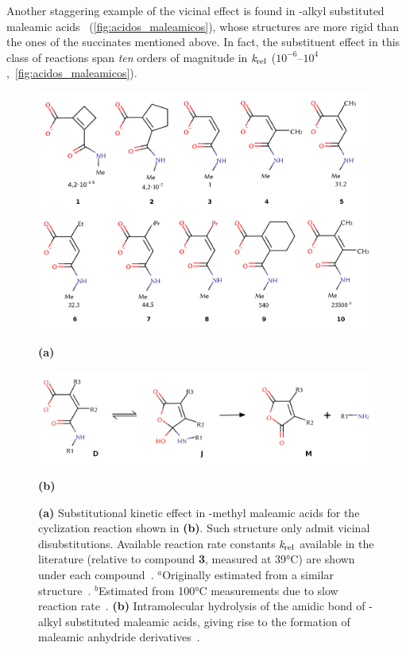 Another staggering example of the vicinal effect is found in
\emph{}-alkyl substituted maleamic acids~\cite{Kirby_1972,Karaman_2011} (\autoref{fig:acidos_maleamicos}),
whose structures are more rigid than the ones of the
succinates mentioned above.
In fact, the substituent effect in this class of reactions span \emph{ten}
orders of magnitude in
$\emph{k}_\text{rel}$ ($10^{-6}$--$10^{4}$,~\autoref{fig:acidos_maleamicos}).
%
\begin{figure}[hbtp]
    \centering
    \includegraphics[width=.8\textwidth]{figures/acidos_maleamicos}

    \textbf{(a)}

    \includegraphics[width=.8\textwidth]{figures/acidos_maleamicos_reacao}

    \textbf{(b)}

    \caption[Intramolecular hydrolysis of the amidic bond in maleamic acids and
    their -methyl substitutional kinetic effect.]{
        \textbf{(a)}
        Substitutional kinetic effect in -methyl
        maleamic acids for the cyclization reaction shown in \textbf{(b)}.
        Such structure only admit vicinal disubstitutions.
        Available reaction rate constants $\emph{k}_\text{rel}$ available in
        the literature (relative to compound \textbf{3}, measured at 39°C)
        are shown under each compound~\cite{Kirby_1972}.
        $^a$Originally estimated from a similar structure~\cite{Kirby_1972}.
        $^b$Estimated from 100°C measurements due to slow reaction rate~\cite{Kirby_1972}.
        \textbf{(b)}
        Intramolecular hydrolysis of the amidic bond of \emph{}-alkyl
    substituted maleamic acids, giving rise to the formation of maleamic
anhydride derivatives~\cite{Kirby_1972,Jung_2005,Karaman_2011}.}%
    \label{fig:acidos_maleamicos_reacao}
    \label{fig:acidos_maleamicos}
\end{figure}
